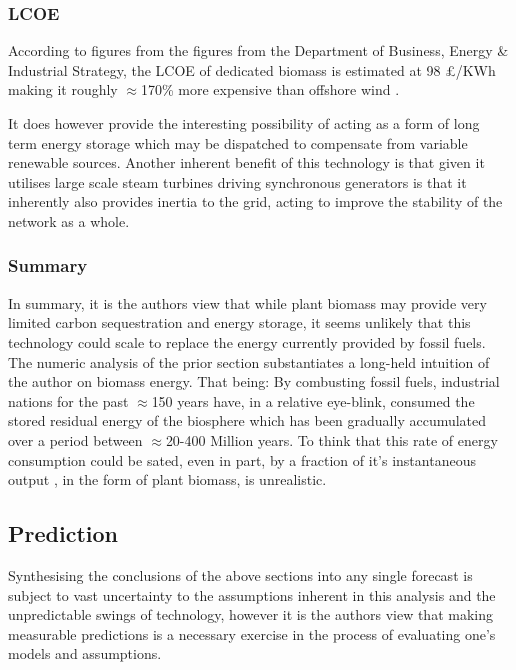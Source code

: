 \documentclass[11pt]{article}
\numberwithin{equation}{section}
\begin{document}
\subsubsection{LCOE}
\label{sec:org80fc3ee}
According to figures from the figures from the Department of Business, Energy \& Industrial Strategy, the LCOE of dedicated biomass is estimated at 98 £/KWh making it roughly \(\approx\)170\% more expensive than offshore wind \cite{DeptEnerLCOE}.

It does however provide the interesting possibility of acting as a form of long term energy storage which may be dispatched to compensate from variable renewable sources. Another inherent benefit of this technology is that given it utilises large scale steam turbines driving synchronous generators is that it inherently also provides inertia to the grid, acting to improve the stability of the network as a whole.

\subsubsection{Summary}
\label{sec:org6363a7f}
In summary, it is the authors view that while plant biomass may provide very limited carbon sequestration and energy storage, it seems unlikely that this technology could scale to replace the energy currently provided by fossil fuels. The numeric analysis of the prior section substantiates a long-held intuition of the author on biomass energy. That being: By combusting fossil fuels, industrial nations for the past \(\approx\)150 years have, in a relative eye-blink, consumed the stored residual energy of the biosphere which has been gradually accumulated over a period between \(\approx\)20-400 Million years. To think that this rate of energy consumption could be sated, even in part, by a fraction of it's instantaneous output , in the form of plant biomass, is unrealistic.
\subsection{Prediction}
\label{sec:orgef8415d}
Synthesising the conclusions of the above sections into any single forecast is subject to vast uncertainty to the assumptions inherent in this analysis and the unpredictable swings of technology, however it is the authors view that making measurable predictions is a necessary exercise in the process of evaluating one's models and assumptions.
\end{document}
